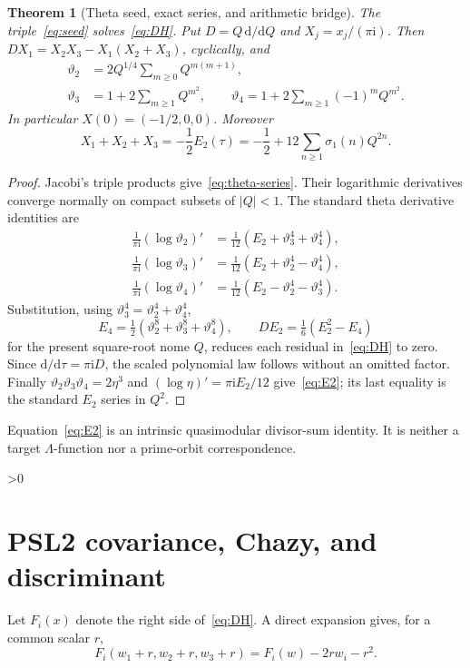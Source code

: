 \documentclass[10pt]{article}
\providecommand{\CRevisionRound}{2}
\newtheorem{theorem}{Theorem}
\newcommand{\ii}{\mathrm i}
\newcommand{\dd}{\mathrm d}
\begin{document}
\begin{theorem}[Theta seed, exact series, and arithmetic bridge]\label{thm:theta}
The triple~\eqref{eq:seed} solves~\eqref{eq:DH}.  Put
$D=Q\,\dd/\dd Q$ and $X_j=x_j/(\pi\ii)$.  Then
$DX_1=X_2X_3-X_1(X_2+X_3)$, cyclically, and
\begin{align}
\vartheta_2&=2Q^{1/4}\sum_{m\geq0}Q^{m(m+1)},\nonumber\\
\vartheta_3&=1+2\sum_{m\geq1}Q^{m^2},\qquad
\vartheta_4=1+2\sum_{m\geq1}(-1)^mQ^{m^2}.
\label{eq:theta-series}
\end{align}
In particular $X(0)=(-1/2,0,0)$.  Moreover
\begin{equation}\label{eq:E2}
 X_1+X_2+X_3=-\frac12E_2(\tau)
 =-\frac12+12\sum_{n\geq1}\sigma_1(n)Q^{2n}.
\end{equation}
\end{theorem}
\begin{proof}
Jacobi's triple products give~\eqref{eq:theta-series}.  Their logarithmic
derivatives converge normally on compact subsets of $|Q|<1$.  The standard
theta derivative identities are
\begin{align*}
 \frac1{\pi\ii}(\log\vartheta_2)'&=\frac1{12}
 (E_2+\vartheta_3^4+\vartheta_4^4),\\
 \frac1{\pi\ii}(\log\vartheta_3)'&=\frac1{12}
 (E_2+\vartheta_2^4-\vartheta_4^4),\\
 \frac1{\pi\ii}(\log\vartheta_4)'&=\frac1{12}
 (E_2-\vartheta_2^4-\vartheta_3^4).
\end{align*}
Substitution, using $\vartheta_3^4=\vartheta_2^4+\vartheta_4^4$,
\[
 E_4=\tfrac12(\vartheta_2^8+\vartheta_3^8+\vartheta_4^8),\qquad
 DE_2=\tfrac16(E_2^2-E_4)
\]
for the present square-root nome $Q$, reduces each residual in~\eqref{eq:DH} to
zero.  Since $\dd/\dd\tau=\pi\ii D$, the scaled polynomial law follows
without an omitted factor.  Finally
$\vartheta_2\vartheta_3\vartheta_4=2\eta^3$ and
$(\log\eta)'=\pi\ii E_2/12$ give~\eqref{eq:E2}; its last equality is the
standard $E_2$ series in $Q^2$.
\end{proof}

Equation~\eqref{eq:E2} is an intrinsic quasimodular divisor-sum identity.
It is neither a target $\Lambda$-function nor a prime-orbit correspondence.

\ifnum\CRevisionRound>0
\section{PSL2 covariance, Chazy, and discriminant}
Let $F_i(x)$ denote the right side of~\eqref{eq:DH}.  A direct expansion
gives, for a common scalar $r$,
\begin{equation}\label{eq:shift}
 F_i(w_1+r,w_2+r,w_3+r)=F_i(w)-2rw_i-r^2.
\end{equation}
\end{document}
